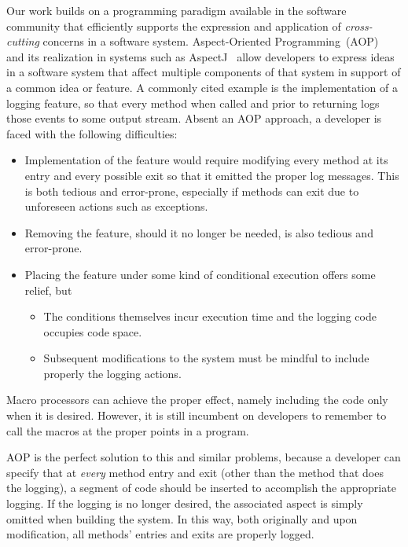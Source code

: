 \documentclass[sigplan,anonymous,review]{acmart}
\begin{document}
Our work builds on a programming paradigm available in the software community that efficiently supports the expression and application of \emph{cross-cutting} concerns in a software system.  Aspect-Oriented Programming~(AOP)~\cite{gregor:97} and its realization in systems such as AspectJ~\cite{aspectj} allow developers to express ideas in a software system that affect multiple components of that system in support of a common idea or feature. A commonly cited example is the implementation of a logging feature, so that every method when called and prior to returning logs those events to some output stream. Absent an AOP approach, a developer is faced with the following difficulties:
\begin{itemize}
    \item Implementation of the feature would require modifying every method at its entry and every possible exit so that it emitted the proper log messages.  This is both tedious and error-prone, especially if methods can exit due to unforeseen actions such as exceptions.
    \item Removing the feature, should it no longer be needed, is also tedious and error-prone.
    \item Placing the feature under some kind of conditional execution offers some relief, but
    \begin{itemize}
        \item The conditions themselves incur execution time and the logging code occupies code space.
        \item Subsequent modifications to the system must be mindful to include properly the logging actions.
    \end{itemize}
\end{itemize}
Macro processors can achieve the proper effect, namely including the code only when it is desired.  However, it is still incumbent on developers to remember to call the macros at the proper points in a program.

AOP is the perfect solution to this and similar problems, because a developer can specify that at \emph{every} method entry and exit (other than the method that does the logging), a segment of code should be inserted to accomplish the appropriate logging.  If the logging is no longer desired, the associated aspect is simply omitted when building the system.  In this way, both originally and upon modification, all methods' entries and exits are properly logged.
\end{document}

